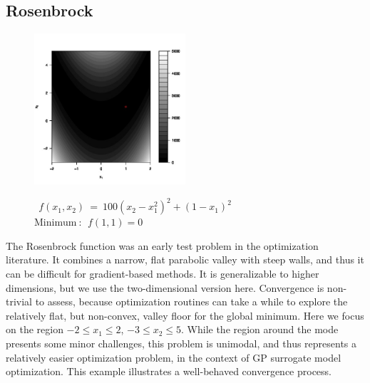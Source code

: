 \documentclass[12pt]{article}
\begin{document}
%
%
\subsection{Rosenbrock}
%
%

%
\begin{figure}
	\vspace{-2.25cm}
        \includegraphics[width=0.5\textwidth]{./figures/roseContourBW.jpg}
	\vspace{-2cm}
	\begin{center}
        $~~f(x_1, x_2) ~=~ 100\left(x_2-x_1^2\right)^2 + (1-x_1)^2$ \\
        $\text{Minimum}~:~~ f(1, 1)=0~~~~~~~~~~~~~~~~$%
	\end{center}
\end{figure}

%
The Rosenbrock function \citep{rosePaper} was an early test problem in the optimization literature. 
%
It combines a narrow, flat parabolic valley with steep walls, and thus it can be difficult for gradient-based methods. It is generalizable to higher dimensions, but we use the two-dimensional version here.
%
Convergence is non-trivial to assess, because optimization routines can take a while to explore the relatively flat, but non-convex, valley floor for the global minimum.  
%
Here we focus on the region $-2\le x_1\le2$, $-3\le x_2\le5$.  
%
While the region around the mode presents some minor challenges, this problem is unimodal, and thus represents a relatively easier optimization problem, in the context of GP surrogate model optimization.  
%
This example illustrates a well-behaved convergence process.
\end{document}
